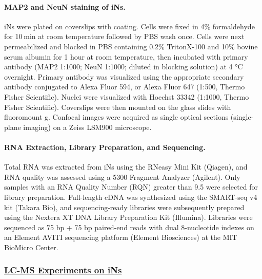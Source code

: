 \documentclass[12pt]{article}
\begin{document}
\paragraph{MAP2 and NeuN staining of iNs.}
iNs were plated on coverslips with coating. Cells were fixed in 4\% formaldehyde for 10 min at room temperature followed by PBS wash once. Cells were next permeabilized and blocked in PBS containing 0.2\% TritonX-100 and 10\% bovine serum albumin for 1 hour at room temperature, then incubated with primary antibody (MAP2 1:1000; NeuN 1:1000; diluted in blocking solution) at 4 °C overnight. Primary antibody was visualized using the appropriate secondary antibody conjugated to Alexa Fluor 594, or Alexa Fluor 647 (1:500, Thermo Fisher Scientific). Nuclei were visualized with Hoechst 33342 (1:1000, Thermo Fisher Scientific). Coverslips were then mounted on the glass slides with fluoromount g. Confocal images were acquired as single optical sections (single-plane imaging) on a Zeiss LSM900 microscope.

\paragraph{RNA Extraction, Library Preparation, and Sequencing.}
Total RNA was extracted from iNs using the RNeasy Mini Kit (Qiagen), and RNA quality was assessed using a 5300 Fragment Analyzer (Agilent). Only samples with an RNA Quality Number (RQN) greater than 9.5 were selected for library preparation. Full-length cDNA was synthesized using the SMART-seq v4 kit (Takara Bio), and sequencing-ready libraries were subsequently prepared using the Nextera XT DNA Library Preparation Kit (Illumina). Libraries were sequenced as 75 bp + 75 bp paired-end reads with dual 8-nucleotide indexes on an Element AVITI sequencing platform (Element Biosciences) at the MIT BioMicro Center.  \subsubsection{\underline{LC-MS Experiments on iNs}} 
\end{document}
